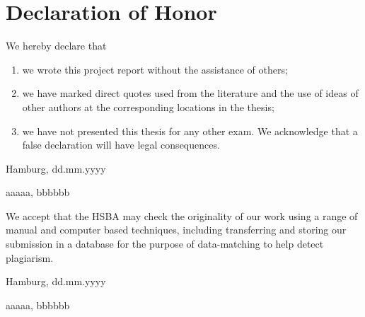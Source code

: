 \documentclass[
  11pt,
  a4paper,
  twoside]{scrbook}
\providecommand{\tightlist}{%
  \setlength{\itemsep}{0pt}\setlength{\parskip}{0pt}}
\begin{document}
\newpage

\hypertarget{declaration-of-honor}{%
\chapter*{Declaration of Honor}\label{declaration-of-honor}}

We hereby declare that

\begin{enumerate}
\def\labelenumi{\arabic{enumi}.}
\tightlist
\item
  we wrote this project report without the assistance of others;
\item
  we have marked direct quotes used from the literature and the use of ideas of other authors at the corresponding locations in the thesis;
\item
  we have not presented this thesis for any other exam. We acknowledge that a false declaration will have legal consequences.
\end{enumerate}

Hamburg, dd.mm.yyyy

aaaaa, bbbbbb

\vspace{2.5cm}

We accept that the HSBA may check the originality of our work using a range of manual and computer based techniques, including transferring and storing our submission in a database for the purpose of data-matching to help detect plagiarism.

Hamburg, dd.mm.yyyy

aaaaa, bbbbbb



\doublespacing
\end{document}
